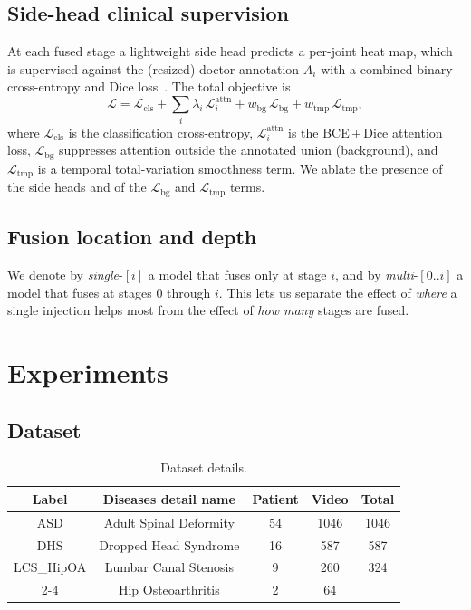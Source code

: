 \documentclass[review,authoryear,times]{elsarticle}
\begin{document}
\subsection{Side-head clinical supervision}
At each fused stage a lightweight side head predicts a per-joint heat map, which
is supervised against the (resized) doctor annotation $A_i$ with a combined
binary cross-entropy and Dice loss~\citep{milletari2016vnet,ronneberger2015unet}.
The total objective is
\begin{equation}
\mathcal{L} = \mathcal{L}_{\mathrm{cls}}
  + \sum_i \lambda_i\, \mathcal{L}^{\mathrm{attn}}_i
  + w_{\mathrm{bg}}\,\mathcal{L}_{\mathrm{bg}}
  + w_{\mathrm{tmp}}\,\mathcal{L}_{\mathrm{tmp}},
\end{equation}
where $\mathcal{L}_{\mathrm{cls}}$ is the classification cross-entropy,
$\mathcal{L}^{\mathrm{attn}}_i$ is the BCE\,+\,Dice attention loss,
$\mathcal{L}_{\mathrm{bg}}$ suppresses attention outside the annotated union
(background), and $\mathcal{L}_{\mathrm{tmp}}$ is a temporal total-variation
smoothness term. We ablate the presence of the side heads and of the
$\mathcal{L}_{\mathrm{bg}}$ and $\mathcal{L}_{\mathrm{tmp}}$ terms.

\subsection{Fusion location and depth}
We denote by \emph{single}-$[i]$ a model that fuses only at stage $i$, and by
\emph{multi}-$[0..i]$ a model that fuses at stages $0$ through $i$. This lets us
separate the effect of \emph{where} a single injection helps most from the effect
of \emph{how many} stages are fused.

\section{Experiments}
\label{sec:exp}

\subsection{Dataset}
\label{subsec:dataset}

\begin{table}[!ht]
    \centering
    \small
    \caption{Dataset details.}
    \label{tab:dataset}
    
    \begin{tabular}{|c|c|c|c|c|}
        \hline
        Label       & Diseases detail name   & Patient & Video & Total \\
        \hline
        ASD         & Adult Spinal Deformity & 54      & 1046  & 1046  \\
        \hline
        DHS         & Dropped Head Syndrome  & 16      & 587   & 587   \\
        \hline
        LCS\_HipOA  & Lumbar Canal Stenosis  & 9       & 260   & 324   \\
        \cline{2-4} & Hip Osteoarthritis     & 2       & 64    &       \\
        \hline
    \end{tabular}
\end{table}
\end{document}
